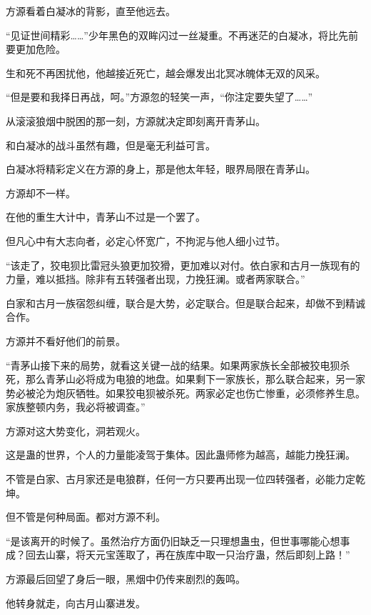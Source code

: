 
\begin{this_body}



方源看着白凝冰的背影，直至他远去。

“见证世间精彩……”少年黑色的双眸闪过一丝凝重。不再迷茫的白凝冰，将比先前要更加危险。

生和死不再困扰他，他越接近死亡，越会爆发出北冥冰魄体无双的风采。

“但是要和我择日再战，呵。”方源忽的轻笑一声，“你注定要失望了……”

从滚滚狼烟中脱困的那一刻，方源就决定即刻离开青茅山。

和白凝冰的战斗虽然有趣，但是毫无利益可言。

白凝冰将精彩定义在方源的身上，那是他太年轻，眼界局限在青茅山。

方源却不一样。

在他的重生大计中，青茅山不过是一个罢了。

但凡心中有大志向者，必定心怀宽广，不拘泥与他人细小过节。

“该走了，狡电狈比雷冠头狼更加狡猾，更加难以对付。依白家和古月一族现有的力量，难以抵挡。除非有五转强者出现，力挽狂澜。或者两家联合。”

白家和古月一族宿怨纠缠，联合是大势，必定联合。但是联合起来，却做不到精诚合作。

方源并不看好他们的前景。

“青茅山接下来的局势，就看这关键一战的结果。如果两家族长全部被狡电狈杀死，那么青茅山必将成为电狼的地盘。如果剩下一家族长，那么联合起来，另一家势必被沦为炮灰牺牲。如果狡电狈被杀死。两家必定也伤亡惨重，必须修养生息。家族整顿内务，我必将被调查。”

方源对这大势变化，洞若观火。

这是蛊的世界，个人的力量能凌驾于集体。因此蛊师修为越高，越能力挽狂澜。

不管是白家、古月家还是电狼群，任何一方只要再出现一位四转强者，必能力定乾坤。

但不管是何种局面。都对方源不利。

“是该离开的时候了。虽然治疗方面仍旧缺乏一只理想蛊虫，但世事哪能心想事成？回去山寨，将天元宝莲取了，再在族库中取一只治疗蛊，然后即刻上路！”

方源最后回望了身后一眼，黑烟中仍传来剧烈的轰鸣。

他转身就走，向古月山寨进发。


\end{this_body}
